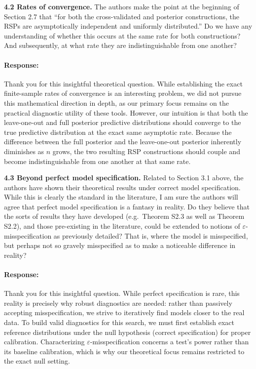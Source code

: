 \documentclass[11pt]{article}
\newcommand*{\mybox}[2]{%
  \par\medskip\noindent
  \colorbox{#1!30}{\parbox{.98\linewidth}{#2}}%
  \par\medskip
}
\begin{document}
\mybox{gray}{\textbf{4.2 Rates of convergence.} The authors make the point at the beginning of Section 2.7 that ``for both the cross-validated and posterior constructions, the RSPs are asymptotically independent and uniformly distributed.'' Do we have any understanding of whether this occurs at the same rate for both constructions? And subsequently, at what rate they are indistinguishable from one another?}

\paragraph{Response:}
Thank you for this insightful theoretical question. While establishing the exact finite-sample rates of convergence is an interesting problem, we did not pursue this mathematical direction in depth, as our primary focus remains on the practical diagnostic utility of these tools. However, our intuition is that both the leave-one-out and full posterior predictive distributions should converge to the true predictive distribution at the exact same asymptotic rate. Because the difference between the full posterior and the leave-one-out posterior inherently diminishes as $n$ grows, the two resulting RSP constructions should couple and become indistinguishable from one another at that same rate.



\mybox{gray}{\textbf{4.3 Beyond perfect model specification.} Related to Section 3.1 above, the authors have shown their theoretical results under correct model specification. While this is clearly the standard in the literature, I am sure the authors will agree that perfect model specification is a fantasy in reality. Do they believe that the sorts of results they have developed (e.g.\ Theorem S2.3 as well as Theorem S2.2), and those pre-existing in the literature, could be extended to notions of $\varepsilon$-misspecification as previously detailed? That is, where the model is misspecified, but perhaps not so gravely misspecified as to make a noticeable difference in reality?}

\paragraph{Response:}
Thank you for this insightful question. While perfect specification is rare, this reality is precisely why robust diagnostics are needed: rather than passively accepting misspecification, we strive to iteratively find models closer to the real data. To build valid diagnostics for this search, we must first establish exact reference distributions under the null hypothesis (correct specification) for proper calibration. Characterizing $\varepsilon$-misspecification concerns a test's power rather than its baseline calibration, which is why our theoretical focus remains restricted to the exact null setting.



\setlength{\bibsep}{0.2em}


\end{document}
